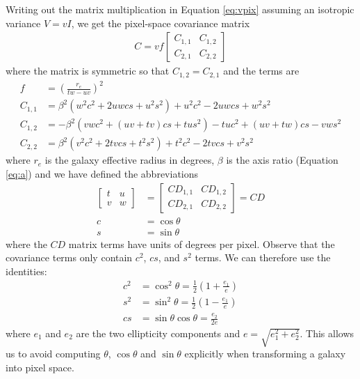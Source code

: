 \documentclass[11pt,letterpaper]{aastex63}
\newcommand{\eqnref}[1]{Equation \ref{#1}}
\newcommand{\CD}{C\!D}
\begin{document}
Writing out the matrix multiplication in \eqnref{eq:vpix} assuming an
isotropic variance $V = v I$, we get the pixel-space covariance matrix
\begin{align}
C = v f \begin{bmatrix}
C_{1,1} & C_{1,2} \\
C_{2,1} & C_{2,2}
\end{bmatrix}
\end{align}
where the matrix is symmetric so that $C_{1,2} = C_{2,1}$ and the terms are
\begin{align}
f & = \left( \frac{r_e}{t w - u v} \right)^2
\\
C_{1,1} & =
%
\beta^2(w^2 c^2 + 2 u w c s + u^2 s^2) + u^2 c^2 - 2 u w c s + w^2 s^2
\\
C_{1,2} & =
%
-\beta^2 (v w c^2 + (u v + t v) c s + t u s^2) - t u c^2 + (u v + t w) c s - v w s^2
\\
C_{2,2} & =
%
\beta^2 (v^2 c^2 + 2 t v c s + t^2 s^2) + t^2 c^2 - 2 t v c s + v^2 s^2
\end{align}
where $r_e$ is the galaxy effective radius in degrees,
$\beta$ is the axis ratio (\eqnref{eq:a}) and
we have defined the abbreviations
\begin{align}
\begin{bmatrix}
t & u \\
v & w
\end{bmatrix}
& = 
\begin{bmatrix}
\CD_{1,1} & \CD_{1,2} \\
\CD_{2,1} & \CD_{2,2}
\end{bmatrix}
=
\CD
\\
c &= \cos \theta \\
s &= \sin \theta
\end{align}
where the $\CD$ matrix terms have units of degrees per pixel.
Observe that the covariance terms only contain $c^2$, $cs$, and $s^2$
terms.  We can therefore use the identities:
\begin{align}
c^2 & = \cos^2 \theta            =
\tfrac{1}{2} \left(1 + \frac{e_1}{e} \right) \\
s^2 & = \sin^2 \theta            =
\tfrac{1}{2} \left(1 - \frac{e_1}{e} \right) \\
cs  & = \sin \theta \cos \theta  = %
\frac{e_2}{2 e}
\end{align}
where $e_1$ and $e_2$ are the two ellipticity components and $e =
\sqrt{e_1^2 + e_2^2}$.  This allows us to avoid computing $\theta$,
$\cos \theta$ and $\sin \theta$ explicitly when transforming a galaxy
into pixel space.
\end{document}

